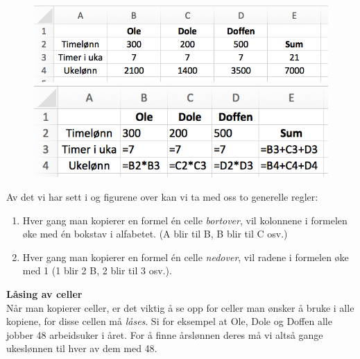 \begin{figure}[H]
	\centering
	\includegraphics[scale=0.3]{figs/ex8}\\[5pt]
	\includegraphics[scale=0.3]{figs/ex15}
\end{figure}
Av det vi har sett i  og figurene over kan vi ta med oss to generelle regler:
\begin{enumerate}
	\item Hver gang man kopierer en formel én celle \textsl{bortover}, vil kolonnene i formelen øke med én bokstav i alfabetet. (A blir til B, B blir til C osv.)
		\item Hver gang man kopierer en formel  én celle \textsl{nedover}, vil radene i formelen øke med 1 (1 blir 2 B, 2 blir til 3 osv.).
\end{enumerate}

\textbf{Låsing av celler}\\[2pt]
Når man kopierer celler, er det viktig å se opp for celler man ønsker å bruke i alle kopiene, for disse cellen må \textit{låses}. Si for eksempel at Ole, Dole og Doffen alle jobber 48 arbeidsuker i året. For å finne årslønnen deres må vi altså gange ukeslønnen til hver av dem med 48. \vsk

